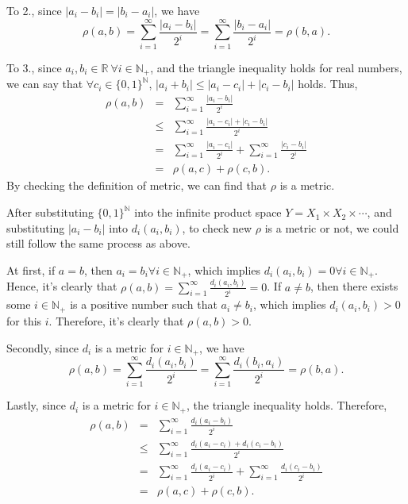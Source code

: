 \documentclass[a4paper]{article}
\newcommand{\R}{\mathbb{R}}
\newcommand{\N}{\mathbb{N}}
\theoremstyle{plain}
\begin{document}
To 2., since $|a_i - b_i| = |b_i - a_i|$, we have
\[
    \rho(a,b) = \sum^{\infty}_{i=1}\frac{|a_i - b_i|}{2^i}
    = \sum^{\infty}_{i=1} \frac{|b_i - a_i|}{2^i}
    = \rho(b,a).
\]

To 3., since $a_i, b_i \in \R \ \forall i \in \N_+$, and the triangle
inequality holds for real numbers, we can say that $\forall c_i \in
\{0,1\}^{\N}$, $|a_i + b_i| \leq |a_i - c_i| + |c_i - b_i|$ holds.
Thus,
\[
    \begin{array}{RCL}
        \rho(a,b) & = & \sum^{\infty}_{i=1}\frac{|a_i-b_i|}{2^i} \\
        & \leq & \sum^{\infty}_{i=1}\frac{|a_i-c_i| + |c_i - b_i|}{2^i} \\
        & = & \sum^{\infty}_{i=1}\frac{|a_i-c_i|}{2^i} 
        + \sum^{\infty}_{i=1}\frac{|c_i-b_i|}{2^i} \\
        & = & \rho(a,c) + \rho(c,b).  
    \end{array}
\]
By checking the definition of metric, we can find that $\rho$ is a metric.

After substituting $\{0,1\}^{\N}$ into the infinite product space
$Y = X_1 \times X_2 \times \cdots$, and substituting $|a_i - b_i|$
into $d_i(a_i, b_i)$, to check new $\rho$ is a metric or not, we could
still follow the same process as above.

At first, if $a = b$, then $a_i = b_i \forall i \in \N_+$, which
implies $d_i(a_i, b_i) = 0 \forall i \in \N_+$. Hence, it's clearly that
$\rho(a,b) = \sum^{\infty}_{i=1} \frac{d_i(a_i,b_i)}{2^i} = 0$.
If $a \neq b$, then there exists some $i \in \N_+$ is a positive number such that
$a_i \neq b_i$, which implies $d_i(a_i,b_i)>0$ for this $i$. Therefore,
it's clearly that $\rho(a,b)>0$.

Secondly, since $d_i$ is a metric for $i \in \N_+$, we have
\[
    \rho(a,b) = \sum^{\infty}_{i=1} \frac{d_i(a_i,b_i)}{2^i}
    = \sum^{\infty}_{i=1} \frac{d_i(b_i,a_i)}{2^i} = \rho(b,a).
\]

Lastly, since $d_i$ is a metric for $i \in \N_+$, the triangle inequality holds.
Therefore,
\[
    \begin{array}{RCL}
        \rho(a,b) & = & \sum^{\infty}_{i=1}\frac{d_i(a_i-b_i)}{2^i} \\
        & \leq & \sum^{\infty}_{i=1}\frac{d_i(a_i-c_i)+ d_i(c_i-b_i)}{2^i} \\
        & = & \sum^{\infty}_{i=1}\frac{d_i(a_i-c_i)}{2^i} 
        + \sum^{\infty}_{i=1}\frac{d_i(c_i-b_i)}{2^i} \\
        & = & \rho(a,c) + \rho(c,b).
    \end{array}
\]
\end{document}
